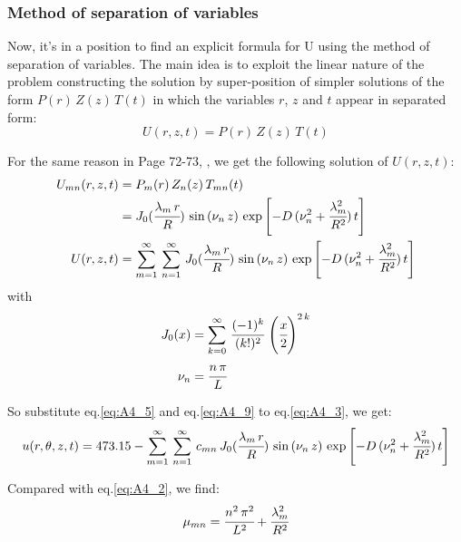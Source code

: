 \documentclass[../main.tex]{subfiles}
\begin{document}
\subsubsection{Method of separation of variables}

Now, it's in a position to find an explicit formula for U using the method of separation of variables. The main idea is to exploit the linear nature of the problem constructing the solution by super-position of simpler solutions of the form $P(r) \, Z(z) \, T(t)$ in which the variables $r$, $z$ and $t$ appear in separated form:
\begin{equation} \label{eq:A4_7}
    U(r, z, t) = P(r) \, Z(z) \, T(t)
\end{equation}

For the same reason in Page 72-73, \cite{salsa2016partial}, we get the following solution of $U(r, z, t)$:
\begin{align}
    U_{mn}(r, z, t) &= P_m(r) \, Z_n(z) \, T_{mn}(t) \nonumber \\
    &= J_0(\cfrac{\lambda_m \, r}{R}) \, \sin{(\nu_n \, z)} \, \exp{\left[- D \, (\nu_n^2 + \cfrac{\lambda_m^2}{R^2}) \, t \right]} \label{eq:A4_8} \\
    U(r, z, t) &= \sum_{m=1}^{\infty} \, \sum_{n=1}^{\infty} \, J_0(\cfrac{\lambda_m \, r}{R}) \, \sin{(\nu_n \, z)} \, \exp{\left[- D \, (\nu_n^2 + \cfrac{\lambda_m^2}{R^2}) \, t \right]} \label{eq:A4_9}
\end{align}
with
\begin{align}
    J_0(x) &= \sum_{k=0}^{\infty} \, \cfrac{(- 1)^k}{(k !)^2} \, \left(\cfrac{x}{2}\right)^{2 \, k} \label{eq:A4_10} \\
    \nu_n &= \cfrac{n \, \pi}{L} \label{eq:A4_11}
\end{align}

So substitute eq.\ref{eq:A4_5} and eq.\ref{eq:A4_9} to eq.\ref{eq:A4_3}, we get:
\begin{equation} \label{eq:A4_12}
    u(r, \theta, z, t) = 473.15 - \sum_{m=1}^{\infty} \, \sum_{n=1}^{\infty} \, c_{mn} \, J_0(\cfrac{\lambda_m \, r}{R}) \, \sin{(\nu_n \, z)} \, \exp{\left[- D \, (\nu_n^2 + \cfrac{\lambda_m^2}{R^2}) \, t \right]}
\end{equation}

Compared with eq.\ref{eq:A4_2}, we find:
\begin{equation} \label{eq:A4_13}
    \mu_{mn} = \cfrac{n^2 \, \pi^2}{L^2} + \cfrac{\lambda_m^2}{R^2}
\end{equation}
\end{document}
